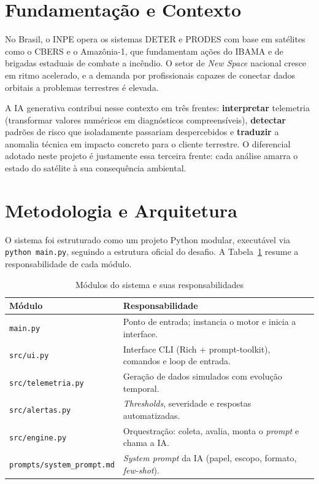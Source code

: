\documentclass[12pt,a4paper]{article}
\begin{document}
\section{Fundamentação e Contexto}

No Brasil, o INPE opera os sistemas DETER e PRODES com base em satélites como o CBERS e o Amazônia-1, que fundamentam ações do IBAMA e de brigadas estaduais de combate a incêndio. O setor de \textit{New Space} nacional cresce em ritmo acelerado, e a demanda por profissionais capazes de conectar dados orbitais a problemas terrestres é elevada.

A IA generativa contribui nesse contexto em três frentes: \textbf{interpretar} telemetria (transformar valores numéricos em diagnósticos compreensíveis), \textbf{detectar} padrões de risco que isoladamente passariam despercebidos e \textbf{traduzir} a anomalia técnica em impacto concreto para o cliente terrestre. O diferencial adotado neste projeto é justamente essa terceira frente: cada análise amarra o estado do satélite à sua consequência ambiental.

\section{Metodologia e Arquitetura}

O sistema foi estruturado como um projeto Python modular, executável via \texttt{python main.py}, seguindo a estrutura oficial do desafio. A Tabela~\ref{tab:modulos} resume a responsabilidade de cada módulo.

\begin{table}[H]
\centering
\caption{Módulos do sistema e suas responsabilidades}
\label{tab:modulos}
\small
\begin{tabular}{@{}ll@{}}
\toprule
\textbf{Módulo} & \textbf{Responsabilidade} \\
\midrule
\texttt{main.py} & Ponto de entrada; instancia o motor e inicia a interface. \\
\texttt{src/ui.py} & Interface CLI (Rich + prompt-toolkit), comandos e loop de entrada. \\
\texttt{src/telemetria.py} & Geração de dados simulados com evolução temporal. \\
\texttt{src/alertas.py} & \textit{Thresholds}, severidade e respostas automatizadas. \\
\texttt{src/engine.py} & Orquestração: coleta, avalia, monta o \textit{prompt} e chama a IA. \\
\texttt{prompts/system\_prompt.md} & \textit{System prompt} da IA (papel, escopo, formato, \textit{few-shot}). \\
\bottomrule
\end{tabular}
\end{table}
\end{document}
